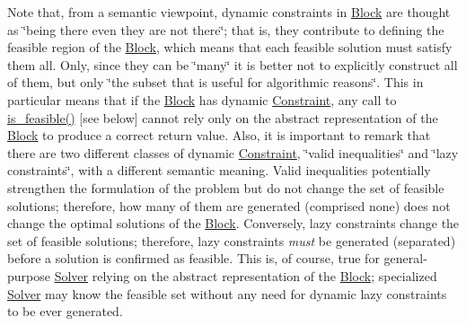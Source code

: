 Note that, from a semantic viewpoint, dynamic constraints in \mbox{\hyperlink{class_s_m_spp__di__unipi__it_1_1_block}{Block}} are thought as \char`\"{}being there even they are not there\char`\"{}; that is, they contribute to defining the feasible region of the \mbox{\hyperlink{class_s_m_spp__di__unipi__it_1_1_block}{Block}}, which means that each feasible solution must satisfy them all. Only, since they can be \char`\"{}many\char`\"{} it is better not to explicitly construct all of them, but only \char`\"{}the
subset that is useful for algorithmic reasons\char`\"{}. This in particular means that if the \mbox{\hyperlink{class_s_m_spp__di__unipi__it_1_1_block}{Block}} has dynamic \mbox{\hyperlink{class_s_m_spp__di__unipi__it_1_1_constraint}{Constraint}}, any call to \mbox{\hyperlink{class_s_m_spp__di__unipi__it_1_1_block_a4204ffb542117f4ea97eeceeda4da079}{is\+\_\+feasible()}} \mbox{[}see below\mbox{]} cannot rely only on the abstract representation of the \mbox{\hyperlink{class_s_m_spp__di__unipi__it_1_1_block}{Block}} to produce a correct return value. Also, it is important to remark that there are two different classes of dynamic \mbox{\hyperlink{class_s_m_spp__di__unipi__it_1_1_constraint}{Constraint}}, \char`\"{}valid
inequalities\char`\"{} and \char`\"{}lazy constraints\char`\"{}, with a different semantic meaning. Valid inequalities potentially strengthen the formulation of the problem but do not change the set of feasible solutions; therefore, how many of them are generated (comprised none) does not change the optimal solutions of the \mbox{\hyperlink{class_s_m_spp__di__unipi__it_1_1_block}{Block}}. Conversely, lazy constraints change the set of feasible solutions; therefore, lazy constraints {\itshape must} be generated (separated) before a solution is confirmed as feasible. This is, of course, true for general-\/purpose \mbox{\hyperlink{class_s_m_spp__di__unipi__it_1_1_solver}{Solver}} relying on the abstract representation of the \mbox{\hyperlink{class_s_m_spp__di__unipi__it_1_1_block}{Block}}; specialized \mbox{\hyperlink{class_s_m_spp__di__unipi__it_1_1_solver}{Solver}} may know the feasible set without any need for dynamic lazy constraints to be ever generated.

